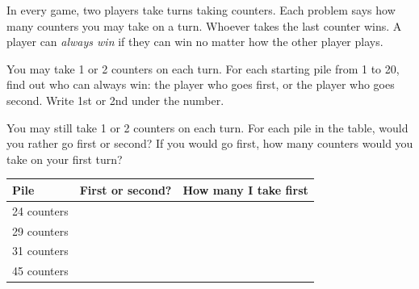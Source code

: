

\newcommand{\bsize}{\fontsize{13.5}{19}\selectfont}
\newcommand{\twenty}{\begin{center}\recstrip{1}{20}{10}{1.72}{1.8}\end{center}}
\newcommand{\blank}[1]{\rule[-0.15em]{#1}{0.5pt}}
\newcommand{\trp}[2]{\tworowpic{#1}{#2}{7.0}{2.6}{0.92}{1.12}{ctr=0.66cm}{%
    \node[anchor=west, font=\fontsize{13}{13}\selectfont] at (-3.5,-0.75) {First or second?};
    \draw[line width=0.5pt] (0.4,-0.95) -- (3.5,-0.95);}}


\bsize

In every game, two players take turns taking counters. Each problem says how many counters you may take on a turn. Whoever takes the last counter wins. A player can \emph{always win} if they can win no matter how the other player plays.

\vspace{9mm}
 You may take 1 or 2 counters on each turn. For each starting pile from 1 to 20, find out who can always win: the player who goes first, or the player who goes second. Write 1st or 2nd under the number.

\vspace{4mm}
\twenty

\newpage
{} You may still take 1 or 2 counters on each turn. For each pile in the table, would you rather go first or second? If you would go first, how many counters would you take on your first turn?

\vspace{6mm}
\begin{center}
\renewcommand{\arraystretch}{1.0}
\begin{tabular}{|>{\centering\arraybackslash}m{2.6cm}|>{\centering\arraybackslash}m{5.0cm}|>{\centering\arraybackslash}m{6.4cm}|}
\hline
\rule[-0.35cm]{0pt}{1.0cm}\textbf{Pile} & \rule[-0.35cm]{0pt}{1.0cm}\textbf{First or second?} & \rule[-0.35cm]{0pt}{1.0cm}\textbf{How many I take first} \\
\hline
\rule[-0.6cm]{0pt}{1.5cm}24 counters & & \\ \hline
\rule[-0.6cm]{0pt}{1.5cm}29 counters & & \\ \hline
\rule[-0.6cm]{0pt}{1.5cm}31 counters & & \\ \hline
\rule[-0.6cm]{0pt}{1.5cm}45 counters & & \\ \hline
\end{tabular}
\end{center}

